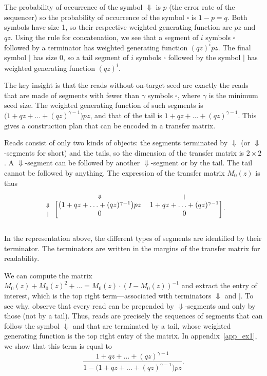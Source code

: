 \documentclass{article}
\begin{document}
The probability of occurrence of the symbol $\Downarrow$ is $p$ (the error
rate of the sequencer) so the probability of occurrence of the symbol
$\square$ is $1-p = q$. Both symbols have size 1, so their respective
weighted generating function are $pz$ and $qz$. Using the rule for
concatenation, we see that a segment of $i$ symbols $\square$ followed by
a terminator has weighted generating function $(qz)^ipz$. The final symbol
$|$ has size 0, so a tail segment of $i$ symbols $\square$ followed by the
symbol $|$ has weighted generating function $(qz)^i$.

The key insight is that the reads without on-target seed are exactly the
reads that are made of segments with fewer than $\gamma$ symbols
$\square$, where $\gamma$ is the minimum seed size. The weighted
generating function of such segments is $\big( 1+qz+\ldots+(qz)^{\gamma-1}
\big) pz$, and that of the tail is $1+qz+\ldots+(qz)^{\gamma-1}$. This
gives a construction plan that can be encoded in a transfer matrix.

Reads consist of only two kinds of objects: the segments terminated by
$\Downarrow$ (or $\Downarrow$-segments for short) and the tails, so the
dimension of the transfer matrix is $2 \times 2$. A $\Downarrow$-segment
can be followed by another $\Downarrow$-segment or by the tail. The tail
cannot be followed by anything. The expression of the transfer matrix
$M_0(z)$ is thus
\begin{equation*}
\begin{blockarray}{ccc}
   & \scriptstyle{\Downarrow} & \scriptstyle{|} \\
\begin{block}{c[cc]}
\scriptstyle{\Downarrow} & \big( 1+qz+\ldots+(qz)^{\gamma-1}
\big) pz  & 1+qz+\ldots+(qz)^{\gamma-1} \\
\scriptstyle{|} & 0 & 0 \\
\end{block}
\end{blockarray}.
\end{equation*}

In the representation above, the different types of segments are
identified by their terminator. The terminators are written in the margins
of the transfer matrix for readability.

We can compute the matrix $M_0(z) + M_0(z)^2 + \ldots = M_0(z) \cdot
(I-M_0(z))^{-1}$ and extract the entry of interest, which is the top right
term---associated with terminators $\Downarrow$ and $|$. To see why,
observe that every read can be prepended by $\Downarrow$-segments and only
by those (not by a tail). Thus, reads are precisely the sequences of
segments that can follow the symbol $\Downarrow$ and that are terminated
by a tail, whose weighted generating function is the top right entry of
the matrix. In appendix~\ref{app_ex1}, we show that this term is equal to
\begin{equation}
\label{eq:F}
\frac{1+qz+\ldots+(qz)^{\gamma-1}}
  {1-\big(1+qz+\ldots+(qz)^{\gamma-1} \big) pz}.
\end{equation}
\end{document}
